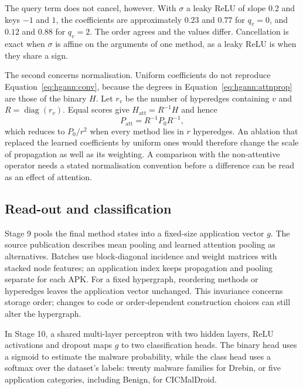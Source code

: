 The query term does not cancel, however. With $\sigma$ a leaky ReLU of slope 0.2 and keys $-1$
and $1$, the coefficients are approximately $0.23$ and $0.77$ for $q_v = 0$, and $0.12$ and $0.88$
for $q_v = 2$. The order agrees and the values differ. Cancellation is exact when $\sigma$ is affine
on the arguments of one method, as a leaky ReLU is when they share a sign.

The second concerns normalisation. Uniform coefficients do not reproduce
Equation~\ref{eq:hgann:conv}, because the degrees in Equation~\ref{eq:hgann:attnprop} are those of
the binary $H$. Let $r_v$ be the number of hyperedges containing $v$ and
$R = \operatorname{diag}(r_v)$. Equal scores give $H_{\text{att}} = R^{-1} H$ and hence
\begin{equation}
  P_{\text{att}} = R^{-1} P_0 R^{-1} ,
  \label{eq:hgann:uniform}
\end{equation}
which reduces to $P_0 / r^2$ when every method lies in $r$ hyperedges.
An ablation that replaced the learned coefficients by uniform ones would therefore
change the scale of propagation as well as its weighting. A comparison with the non-attentive
operator needs a stated normalisation convention before a difference can be read as an effect of
attention.

\subsection*{Read-out and classification}

Stage 9 pools the final method states into a fixed-size application vector $g$. The source
publication describes mean pooling and learned attention pooling as alternatives. Batches use
block-diagonal incidence and weight matrices with stacked node features; an application index
keeps propagation and pooling separate for each APK. For a fixed hypergraph, reordering methods
or hyperedges leaves the application vector unchanged. This invariance concerns storage order;
changes to code or order-dependent construction choices can still alter the hypergraph.

In Stage 10, a shared multi-layer perceptron with two hidden layers, ReLU activations and dropout
maps $g$ to two classification heads. The binary head uses a sigmoid to estimate the malware
probability, while the class head uses a softmax over the dataset's labels: twenty malware
families for Drebin, or five application categories, including Benign, for CICMalDroid.

